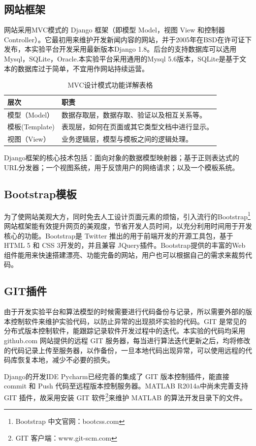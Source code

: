 \documentclass[oneside]{ZJUthesis}
\begin{document}
\subsection{网站框架}
网站采用MVC模式的 Django 框架（即模型 Model，视图 View 和控制器 Controller）。它最初用来维护开发新闻内容的网站，并于2005年在BSD在许可证下发布，本实验平台开发采用最新版本Django 1.8。后台的支持数据库可以选用Mysql，SQLite，Oracle.本实验平台采用通用的Mysql 5.6版本，SQLite是基于文本的数据库过于简单，不宜用作网站持续运营。
\begin{longtable}{|l|l|}
\caption{MVC设计模式功能详解表格}\\ 
\hline
层次&职责 \\
\hline
模型（Model）& 数据存取层，数据存取、验证以及相互关系等。\\
\hline
模板(Template) & 表现层，如何在页面或其它类型文档中进行显示。\\
\hline
视图（View）&业务逻辑层，模型与模板之间的逻辑处理。\\
\hline
\end{longtable}


Django框架的核心技术包括：面向对象的数据模型映射器；基于正则表达式的URL分发器；一个视图系统，用于反馈用户的网络请求；以及一个模板系统。

\subsection{Bootstrap模板}
为了使网站美观大方，同时免去人工设计页面元素的烦恼，引入流行的Bootstrap\footnote{Bootstrap 中文官网：bootcss.com}网站框架能有效提升网页的美观度，节省开发人员时间，以充分利用时间用于开发核心的功能。Bootstrap是 Twitter 推出的用于前端开发的开源工具包，基于HTML 5 和 CSS 3开发的，并且兼容 JQuery插件。Bootstrap提供的丰富的Web组件能用来快速搭建漂亮、功能完备的网站，用户也可以根据自己的需求来裁剪代码。

\subsection{GIT插件}
由于开发实验平台和算法模型的时候需要进行代码备份与记录，所以需要外部的版本控制软件来维护实验代码，以防止异常的出现损坏实验的代码。GIT 是常见的分布式版本控制软件，能跟踪记录软件开发过程中的迭代。本实验的代码均采用 github.com 网站提供的远程 GIT 服务器，每当进行算法迭代更新之后，均将修改的代码记录上传至服务器，以作备份，一旦本地代码出现异常，可以使用远程的代码库恢复本地，减少不必要的损失。

Django的开发IDE Pycharm已经完善的集成了 GIT 版本控制插件，能直接 commit 和 Push 代码至远程版本控制服务器。MATLAB R2014a中尚未完善支持 GIT 插件，故采用安装 GIT 软件\footnote{GIT 客户端：www.git-scm.com}来维护 MATLAB 的算法开发目录下的文件。
\end{document}
